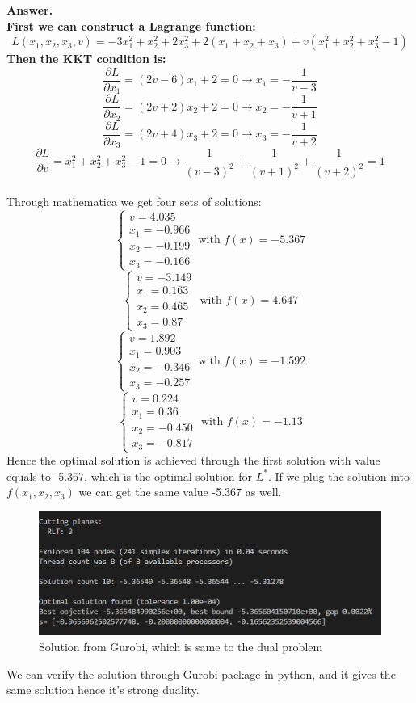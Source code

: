 \documentclass{article}
\theoremstyle{definition}
\theoremstyle{definition}
\theoremstyle{remark}
\begin{document}
{\bf{Answer.
\\First we can construct a Lagrange function:
$$L(x_1,x_2,x_3,v)=-3x_1^2 + x_2^2 + 2x_3^2 + 2(x_1+x_2+x_3)+v(x_1^2 + x_2^2 + x_3^2-1)$$
Then the KKT condition is:
$$\frac{\partial L}{\partial x_1}=(2v-6)x_1+2=0\rightarrow x_1=-\frac{1}{v-3}$$
$$\frac{\partial L}{\partial x_2}=(2v+2)x_2+2=0\rightarrow x_2=-\frac{1}{v+1}$$
$$\frac{\partial L}{\partial x_3}=(2v+4)x_3+2=0\rightarrow x_3=-\frac{1}{v+2}$$
$$\frac{\partial L}{\partial v}=x_1^2 + x_2^2 + x_3^2-1=0\rightarrow \frac{1}{(v-3)^2}+\frac{1}{(v+1)^2}+\frac{1}{(v+2)^2}=1$$
}}
\\Through mathematica we get four sets of solutions:
$$\left\{\begin{array}{c}
    v=4.035 \\
    x_1=-0.966 \\
    x_2=-0.199 \\
    x_3=-0.166 
\end{array}\right.\text{ with }f(x)=-5.367$$
$$\left\{\begin{array}{c}
    v=-3.149 \\
    x_1=0.163 \\
    x_2=0.465 \\
    x_3=0.87 
\end{array}\right.\text{ with }f(x)=4.647$$
$$\left\{\begin{array}{c}
    v=1.892 \\
    x_1=0.903 \\
    x_2=-0.346 \\
    x_3=-0.257 
\end{array}\right.\text{ with }f(x)=-1.592$$
$$\left\{\begin{array}{c}
    v=0.224 \\
    x_1=0.36 \\
    x_2=-0.450 \\
    x_3=-0.817 
\end{array}\right.\text{ with }f(x)=-1.13$$
Hence the optimal solution is achieved through the first solution with value equals to -5.367, which is the optimal solution for $L^*$. If we plug the solution into $f(x_1,x_2,x_3)$ we can get the same value -5.367 as well.
\begin{figure}[H]
    \centering
    \includegraphics[scale=0.5]{p1.png}
    \caption{Solution from Gurobi, which is same to the dual problem}
\end{figure}
We can verify the solution through Gurobi package in python, and it gives the same solution hence it's strong duality.
\end{document}
